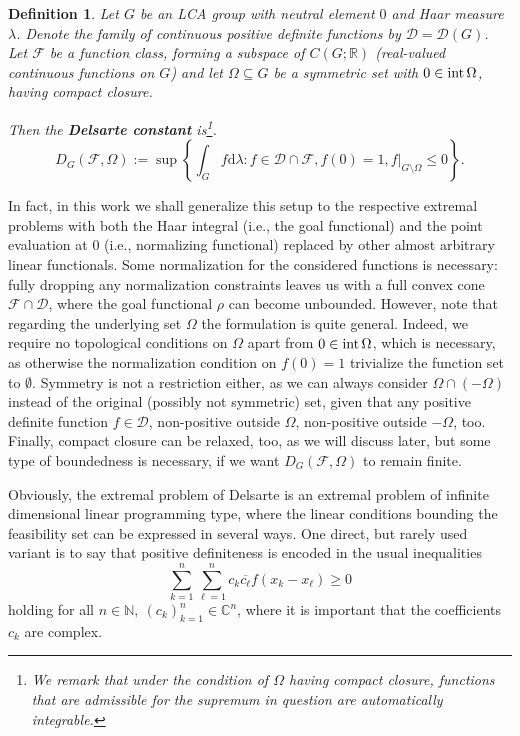 \documentclass[[a4paper,english,12pt]{amsart}
\theoremstyle{plain}
\newtheorem{definition}[theorem]{Definition}
\theoremstyle{remark}
\newcommand{\intt}{\mbox{\rm int\,}}
\newcommand{\Om}{{\Omega}}
\newcommand{\DD}{{\mathcal D}}
\newcommand{\FF}{\mathcal{F}}
\newcommand{\RR}{\mathbb R}
\newcommand{\NN}{\mathbb N}
\newcommand{\CC}{\mathbb C}
\def\dd{\mathrm{d}}
\def\haar{\lambda}
\newcommand{\rh}{\rho}
\begin{document}
\begin{definition}\label{def:Delsarte} Let $G$ be an LCA group with neutral element $0$ and Haar measure $\haar$. Denote the family of continuous positive definite functions by $\DD=\DD(G)$. Let $\FF$ be a function class, forming a subspace of $C(G;\RR)$ (real-valued continuous functions on $G$) and let $\Omega \subseteq  G$ be a symmetric set with $0\in\intt \Om$, having compact closure.

Then the \textbf{Delsarte constant} is\footnote{We remark that under the condition of $\Omega$ having compact closure, functions that are admissible for the supremum in question are automatically  integrable.}.
\begin{equation}\label{Delsarteconst}
D_G(\FF, \Omega):= \sup \left\{ \int_G f\dd \haar : f\in \DD \cap \FF, f(0)=1, f|_{G\setminus \Omega} \le 0\right\}.
\end{equation}
\end{definition}
In fact, in this work we shall generalize this setup to the respective extremal problems with both the Haar integral  (i.e., the goal functional) and the point evaluation at $0$ (i.e., normalizing functional) replaced by other almost arbitrary linear functionals.  Some  normalization for the considered functions is necessary: fully dropping any normalization constraints leaves us with a full convex cone $\FF \cap \DD$, where the goal functional $\rh $ can become unbounded.
 However, note that regarding the underlying set $\Omega$ the formulation is quite general. Indeed, we require no topological conditions on $\Omega$ apart from $0 \in \intt \Omega$, which is necessary, as otherwise the normalization condition on $f(0)=1$ trivialize the function set to $\emptyset$. Symmetry is not a restriction either, as we can always consider $\Omega \cap (-\Omega)$ instead of the original (possibly not symmetric) set, given that any positive definite function $f \in \DD$, non-positive outside $\Omega$, non-positive outside $-\Omega$, too. Finally, compact closure can be relaxed, too, as we will discuss later, but some type of boundedness is necessary, if we want $D_G(\FF,\Omega)$ to remain finite.

Obviously, the extremal problem of Delsarte is an extremal problem of infinite dimensional linear programming type, where the linear conditions bounding the feasibility set can be expressed in several ways. One direct, but rarely used variant is to say that positive definiteness is encoded in the usual inequalities
\begin{equation}\label{eqposdef2}
\sum_{k=1}^n\sum_{\ell=1}^n c_k \overline{c_\ell} f(x_k-x_\ell) \ge 0
\end{equation}
holding for all $n \in \NN,\:(c_k)_{k=1}^n \in \CC^n$, where it is important that the coefficients $c_k$ are complex. 
\end{document}
